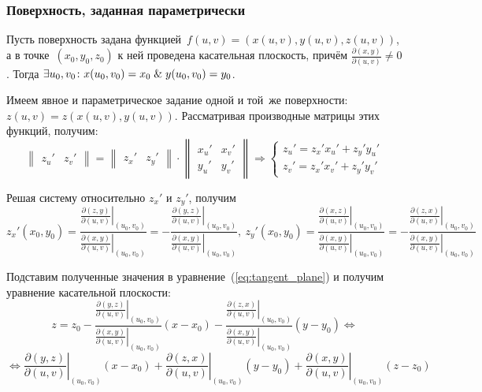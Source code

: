 \subsubsection{Поверхность, заданная параметрически}
Пусть поверхность задана функцией~$f(u, v) = (x(u, v), y(u, v), z(u, v))$, а в точке~$(x_0, y_0, z_0)$ к ней проведена касательная плоскость, причём $\frac{\partial(x, y)}{\partial(u, v)} \neq 0$.
Тогда $\exists u_0, v_0 \colon x(u_0, v_0) = x_0 \mathrel{\&} y(u_0, v_0) = y_0$.

Имеем явное и параметрическое задание одной и той~же поверхности: $z(u, v) = z(x(u, v), y(u, v))$.
Рассматривая производные матрицы этих функций, получим:
\begin{equation*}
\begin{Vmatrix}
z_u' & z_v'
\end{Vmatrix} =
\begin{Vmatrix}
z_x' & z_y'
\end{Vmatrix} \cdot
\begin{Vmatrix}
x_u' & x_v' \\
y_u' & y_v'
\end{Vmatrix} \Rightarrow
\begin{cases}
z_u' = z_x' x_u' + z_y' y_u' \\
z_v' = z_x' x_v' + z_y' y_v'
\end{cases}
\end{equation*}

Решая систему относительно $z_x'$ и $z_y'$, получим
\begin{equation*}
z_x'(x_0, y_0) = \frac
{\left. \frac{\partial(z, y)}{\partial(u, v)} \right|_{(u_0, v_0)}}
{\left. \frac{\partial(x, y)}{\partial(u, v)} \right|_{(u_0, v_0)}} =
-\frac
{\left. \frac{\partial(y, z)}{\partial(u, v)} \right|_{(u_0, v_0)}}
{\left. \frac{\partial(x, y)}{\partial(u, v)} \right|_{(u_0, v_0)}}, \
z_y'(x_0, y_0) = \frac
{\left. \frac{\partial(x, z)}{\partial(u, v)} \right|_{(u_0, v_0)}}
{\left. \frac{\partial(x, y)}{\partial(u, v)} \right|_{(u_0, v_0)}} =
-\frac
{\left. \frac{\partial(z, x)}{\partial(u, v)} \right|_{(u_0, v_0)}}
{\left. \frac{\partial(x, y)}{\partial(u, v)} \right|_{(u_0, v_0)}}
\end{equation*}

Подставим полученные значения в уравнение~(\ref*{eq:tangent_plane}) и получим уравнение касательной плоскости:
\begin{equation*}
z = z_0 - \frac
{\left. \frac{\partial(y, z)}{\partial(u, v)} \right|_{(u_0, v_0)}}
{\left. \frac{\partial(x, y)}{\partial(u, v)} \right|_{(u_0, v_0)}} (x - x_0) -
\frac
{\left. \frac{\partial(z, x)}{\partial(u, v)} \right|_{(u_0, v_0)}}
{\left. \frac{\partial(x, y)}{\partial(u, v)} \right|_{(u_0, v_0)}} (y - y_0)  \Leftrightarrow
\end{equation*}
\begin{equation*}
\Leftrightarrow \left. \frac{\partial(y, z)}{\partial(u, v)} \right|_{(u_0, v_0)} (x - x_0) +
\left. \frac{\partial(z, x)}{\partial(u, v)} \right|_{(u_0, v_0)} (y - y_0) +
\left. \frac{\partial(x, y)}{\partial(u, v)} \right|_{(u_0, v_0)} (z - z_0)
\end{equation*}